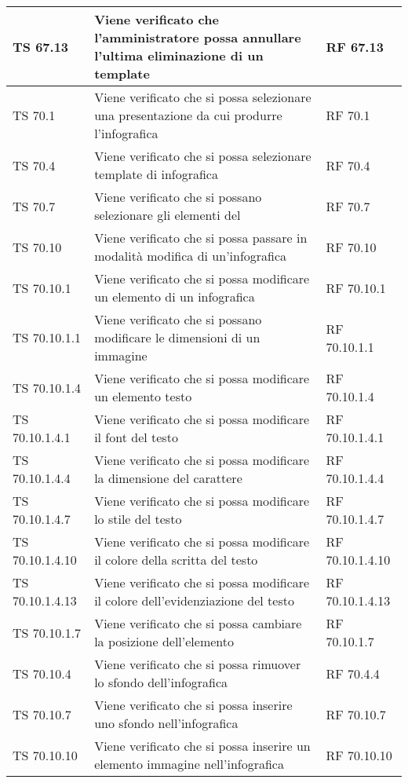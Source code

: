 {{\begin{longtable} [c]{| p{3cm} | p{6cm} |p{3cm}|}
			\hline
			TS 67.13 & Viene verificato che l'amministratore possa annullare l'ultima eliminazione di un template\ped{g} & RF 67.13\\
			\hline
			TS 70.1 & Viene verificato che si possa selezionare una presentazione da cui produrre l'infografica\ped{g}  & RF 70.1\\
			\hline
			TS 70.4 & Viene verificato che si possa selezionare template\ped{g} di infografica\ped{g} & RF 70.4\\
			\hline
			TS 70.7 & Viene verificato che si possano selezionare gli elementi del  & RF 70.7\\
			\hline
			TS 70.10 & Viene verificato che si possa passare in modalità modifica di un'infografica\ped{g} & RF 70.10\\
			\hline
			TS 70.10.1 & Viene verificato che si possa modificare un elemento di un infografica\ped{g} & RF 70.10.1\\
			\hline
			TS 70.10.1.1 & Viene verificato che si possano modificare le dimensioni di un immagine & RF 70.10.1.1\\
			\hline
			TS 70.10.1.4 & Viene verificato che si possa modificare un elemento testo  & RF 70.10.1.4\\
			\hline
			TS 70.10.1.4.1 & Viene verificato che si possa modificare il font\ped{g} del testo & RF 70.10.1.4.1\\
			\hline
			TS 70.10.1.4.4 & Viene verificato che si possa modificare la dimensione del carattere & RF 70.10.1.4.4\\
			\hline
			TS 70.10.1.4.7 & Viene verificato che si possa modificare lo stile del testo & RF 70.10.1.4.7\\
			\hline
			TS 70.10.1.4.10 & Viene verificato che si possa modificare il colore della scritta del testo & RF 70.10.1.4.10\\
			\hline
			TS 70.10.1.4.13 & Viene verificato che si possa modificare il colore dell'evidenziazione del testo & RF 70.10.1.4.13\\
			\hline
			TS 70.10.1.7 & Viene verificato che si possa cambiare la posizione dell'elemento & RF 70.10.1.7\\
			\hline
			TS 70.10.4 & Viene verificato che si possa rimuover lo sfondo dell'infografica\ped{g} & RF 70.4.4\\
			\hline
			TS 70.10.7 & Viene verificato che si possa inserire uno sfondo nell'infografica\ped{g} & RF 70.10.7\\
			\hline
			TS 70.10.10 & Viene verificato che si possa inserire un elemento immagine nell'infografica\ped{g} & RF 70.10.10\\

\end{longtable}}}
